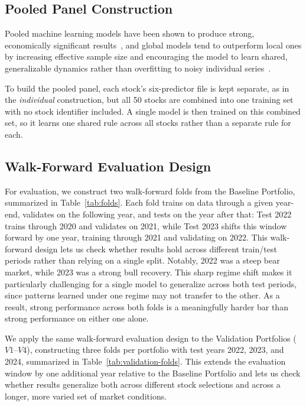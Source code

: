 \subsection{Pooled Panel Construction}
\label{sec:pooled-panel-construction}
Pooled machine learning models have been shown to produce strong, economically significant results~\cite{gu2020empirical}, and global models tend to outperform local ones by increasing effective sample size and encouraging the model to learn shared, generalizable dynamics rather than overfitting to noisy individual series~\cite{montero2021principles}.

To build the pooled panel, each stock's six-predictor file is kept separate, as in the \emph{individual} construction, but all 50 stocks are combined into one training set with no stock identifier included. A single model is then trained on this combined set, so it learns one shared rule across all stocks rather than a separate rule for each.

\subsection{Walk-Forward Evaluation Design}
For evaluation, we construct two walk-forward folds from the Baseline Portfolio, summarized in Table~\ref{tab:folds}. Each fold trains on data through a given year-end, validates on the following year, and tests on the year after that: Test 2022 trains through 2020 and validates on 2021, while Test 2023 shifts this window forward by one year, training through 2021 and validating on 2022. This walk-forward design lets us check whether results hold across different train/test periods rather than relying on a single split. Notably, 2022 was a steep bear market, while 2023 was a strong bull recovery. This sharp regime shift makes it particularly challenging for a single model to generalize across both test periods, since patterns learned under one regime may not transfer to the other. As a result, strong performance across both folds is a meaningfully harder bar than strong performance on either one alone.

We apply the same walk-forward evaluation design to the Validation Portfolios ($V1$--$V4$), constructing three folds per portfolio with test years 2022, 2023, and 2024, summarized in Table~\ref{tab:validation-folds}. This extends the evaluation window by one additional year relative to the Baseline Portfolio and lets us check whether results generalize both across different stock selections and across a longer, more varied set of market conditions.




